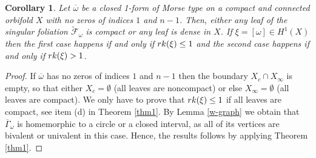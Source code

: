 \documentclass[10pt,a4paper]{amsart}
\newtheorem{corollary}{Corollary}
\begin{document}
\begin{corollary}\label{cor1}
Let $\overline{\omega}$ be a closed 1-form of Morse type on a compact and connected orbifold $X$ with no zeros of indices $1$ and $n-1$. Then, either 
any leaf of the singular foliation $\tilde{\mathcal{F}}_\omega$ is compact or any leaf is dense in $X$. If $\xi=[\omega]\in H^1(X)$ then the first case happens if and only if $\textnormal{rk}(\xi)\leq 1$ and the second case happens if and only if $\textnormal{rk}(\xi)>1$.
 \end{corollary}

\begin{proof}
If $\overline{\omega}$ has no zeros of indices $1$ and $n-1$ then the boundary $X_c\cap X_\infty$ is empty, so that either $X_c=\emptyset$ (all leaves are noncompact) or else $X_\infty=\emptyset$ (all leaves are compact). We only have to prove that $\textnormal{rk}(\xi)\leq 1$ if all leaves are compact, see item (d) in Theorem \ref{thm1}. By Lemma \ref{w-graph} we obtain that $\overline{\Gamma}_\omega$ is homemorphic to a circle or a closed interval, as all of its vertices are bivalent or 
univalent in this case. Hence, the results follows by applying Theorem \ref{thm1}.
\end{proof}
\end{document}
